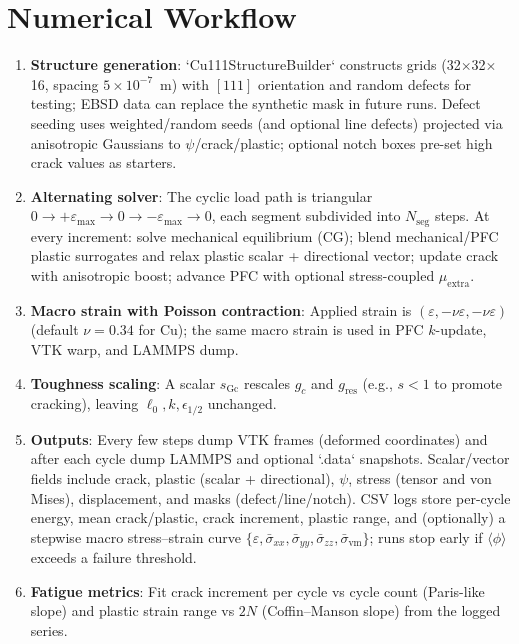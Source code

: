 \documentclass[11pt]{article}
\begin{document}
\section{Numerical Workflow}
\begin{enumerate}
    \item \textbf{Structure generation}: `Cu111StructureBuilder` constructs grids (32$\times$32$\times$16, spacing $5\times10^{-7}$~m) with $[111]$ orientation and random defects for testing; EBSD data can replace the synthetic mask in future runs. Defect seeding uses weighted/random seeds (and optional line defects) projected via anisotropic Gaussians to $\psi$/crack/plastic; optional notch boxes pre-set high crack values as starters.
    \item \textbf{Alternating solver}: The cyclic load path is triangular $0\rightarrow +\varepsilon_{\max}\rightarrow 0 \rightarrow -\varepsilon_{\max}\rightarrow 0$, each segment subdivided into $N_{\text{seg}}$ steps. At every increment: solve mechanical equilibrium (CG); blend mechanical/PFC plastic surrogates and relax plastic scalar + directional vector; update crack with anisotropic boost; advance PFC with optional stress-coupled $\mu_{\text{extra}}$.
    \item \textbf{Macro strain with Poisson contraction}: Applied strain is $(\varepsilon, -\nu \varepsilon, -\nu \varepsilon)$ (default $\nu=0.34$ for Cu); the same macro strain is used in PFC $k$-update, VTK warp, and LAMMPS dump.
    \item \textbf{Toughness scaling}: A scalar $s_{\mathrm{Gc}}$ rescales $g_c$ and $g_{\mathrm{res}}$ (e.g., $s<1$ to promote cracking), leaving $\ell_0,k,\epsilon_{1/2}$ unchanged.
    \item \textbf{Outputs}: Every few steps dump VTK frames (deformed coordinates) and after each cycle dump LAMMPS and optional `.data` snapshots. Scalar/vector fields include crack, plastic (scalar + directional), $\psi$, stress (tensor and von Mises), displacement, and masks (defect/line/notch). CSV logs store per-cycle energy, mean crack/plastic, crack increment, plastic range, and (optionally) a stepwise macro stress--strain curve $\{\varepsilon, \bar{\sigma}_{xx}, \bar{\sigma}_{yy}, \bar{\sigma}_{zz}, \bar{\sigma}_{\mathrm{vm}}\}$; runs stop early if $\langle\phi\rangle$ exceeds a failure threshold.
    \item \textbf{Fatigue metrics}: Fit crack increment per cycle vs cycle count (Paris-like slope) and plastic strain range vs $2N$ (Coffin--Manson slope) from the logged series.
\end{enumerate}
\end{document}
